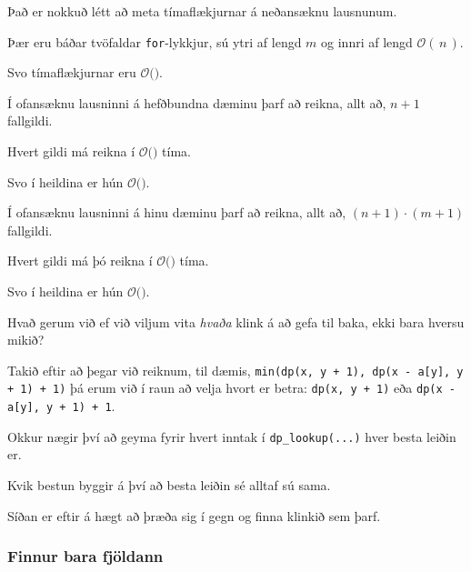 {
}

{
	{
		\item<1-> Það er nokkuð létt að meta tímaflækjurnar á neðansæknu lausnunum.
		\item<2-> Þær eru báðar tvöfaldar \texttt{for}-lykkjur, sú ytri af lengd $m$ og innri af lengd $\mathcal{O}(\,n\,)$.
		\item<3-> Svo tímaflækjurnar eru $\mathcal{O}($\onslide<4->{$n \cdot m$}$)$.
	}
}

{
	{
		\item<1-> Í ofansæknu lausninni á hefðbundna dæminu þarf að reikna, allt að, $n + 1$ fallgildi.
		\item<2-> Hvert gildi má reikna í $\mathcal{O}($$)$ tíma.
		\item<4-> Svo í heildina er hún $\mathcal{O}($\onslide<5->{$n \cdot m$}$)$.
		\item<1->[] 
	}
}

{
	{
		\item<1-> Í ofansæknu lausninni á hinu dæminu þarf að reikna, allt að, $(n + 1) \cdot (m + 1)$ fallgildi.
		\item<2-> Hvert gildi má þó reikna í $\mathcal{O}($$)$ tíma.
		\item<4-> Svo í heildina er hún $\mathcal{O}($\onslide<5->{$n \cdot m$}$)$.
		\item<1->[] 
	}
}

{
	{
		\item<1-> Hvað gerum við ef við viljum vita \emph{hvaða} klink á að gefa til baka, ekki bara hversu mikið?
		\item<2-> Takið eftir að þegar við reiknum, til dæmis, \texttt{min(dp(x, y + 1), dp(x - a[y], y + 1) + 1)}
					þá erum við í raun að velja hvort er betra: \texttt{dp(x, y + 1)} eða \texttt{dp(x - a[y], y + 1) + 1}.
		\item<3-> Okkur nægir því að geyma fyrir hvert inntak í \texttt{dp\_lookup(...)} hver besta leiðin er.
		\item<4-> Kvik bestun byggir á því að besta leiðin sé alltaf sú sama.
		\item<5-> Síðan er eftir á hægt að þræða sig í gegn og finna klinkið sem þarf.
	}
}

{
	\frametitle{Finnur bara fjöldann}
}


